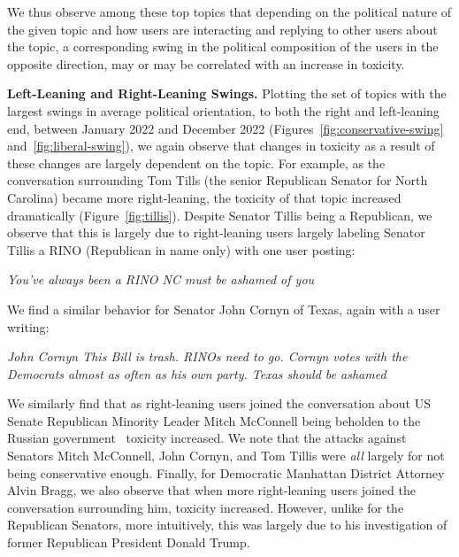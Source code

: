 \noindent
We thus observe among these top topics that depending on the political nature of the given topic and how users are interacting and replying to other users about the topic, a corresponding swing in the political composition of the users in the opposite direction, may or may be correlated with an increase in toxicity. 



\noindent
\vspace{2pt}
\textbf{Left-Leaning and Right-Leaning Swings.} Plotting the set of topics with the largest swings in average political orientation, to both the right and left-leaning end, between January 2022 and December 2022 (Figures~\ref{fig:conservative-swing} and~\ref{fig:liberal-swing}), we again observe that changes in toxicity as a result of these changes are largely dependent on the topic. For example, as the conversation surrounding Tom Tills (the senior Republican Senator for North Carolina) became more right-leaning, the toxicity of that topic increased dramatically (Figure~\ref{fig:tillis}). Despite Senator Tillis being a Republican, we observe that this is largely due to right-leaning users largely labeling Senator Tillis a RINO (Republican in name only) with one user posting:

\begin{displayquote}
\small
\textit{You've always been a RINO
NC must be ashamed of you}
\end{displayquote}
\noindent We find a similar behavior for Senator John Cornyn of Texas, again with a user writing:

\begin{displayquote}
\small
\textit{John Cornyn This Bill is trash. RINOs need to go.
Cornyn votes with the Democrats almost as often as his own party.
Texas should be ashamed}
\end{displayquote} We similarly find that as right-leaning users joined the conversation about US Senate Republican Minority Leader Mitch McConnell being beholden to the Russian government~\cite{Hulse2018} toxicity increased. We note that the attacks against Senators Mitch McConnell, John Cornyn, and Tom Tillis were \emph{all} largely for not being conservative enough. Finally, for Democratic Manhattan District Attorney Alvin Bragg, we also observe that when more right-leaning users joined the conversation surrounding him, toxicity increased. However, unlike for the Republican Senators, more intuitively, this was largely due to his investigation of former Republican President Donald Trump. 

